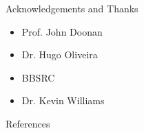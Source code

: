 \documentclass[final]{beamer}
\begin{document}
\begin{frame}{}
\begin{textblock}{27.7}
\begin{block}{Acknowledgements and Thanks}
\begin{multicols}{3}
\begin{itemize}
        \end{itemize}

        \columnbreak

        \begin{itemize}
        \item{Prof. John Doonan}
        \item{Dr. Hugo Oliveira}

        \end{itemize}

        \columnbreak
        
        \begin{itemize}
        \item{BBSRC}
        \item{Dr. Kevin Williams}
        \end{itemize}
        
      \end{multicols}

    \end{block}

    \begin{block}{References}
      
      
    \end{block}

    
  \end{textblock}

\end{frame}
\end{document}

